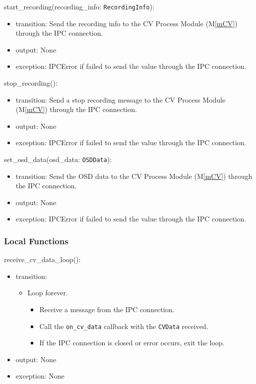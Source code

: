 \documentclass[12pt, titlepage]{article}
\newcommand{\mref}[1]{M\ref{#1}}
\begin{document}
\noindent start\_recording(recording\_info: \texttt{RecordingInfo}):
\begin{itemize}
  \item transition: Send the recording info to the CV Process Module (\mref{mCV})
        through the IPC connection.
  \item output: None
  \item exception: IPCError if failed to send the value through the IPC connection.
\end{itemize}

\noindent stop\_recording():
\begin{itemize}
  \item transition: Send a stop recording message to the CV Process Module (\mref{mCV})
        through the IPC connection.
  \item output: None
  \item exception: IPCError if failed to send the value through the IPC connection.
\end{itemize}

\noindent set\_osd\_data(osd\_data: \texttt{OSDData}):
\begin{itemize}
  \item transition: Send the OSD data to the CV Process Module (\mref{mCV}) through the
        IPC connection.
  \item output: None
  \item exception: IPCError if failed to send the value through the IPC connection.
\end{itemize}

\subsubsection{Local Functions}

\noindent receive\_cv\_data\_loop():
\begin{itemize}
  \item transition:
        \begin{itemize}
          \item Loop forever.
                \begin{itemize}
                  \item Receive a message from the IPC connection.
                  \item Call the \texttt{on\_cv\_data} callback with the \texttt{CVData} received.
                  \item If the IPC connection is closed or error occurs, exit the loop.
                \end{itemize}
        \end{itemize}
  \item output: None
  \item exception: None
\end{itemize}
\end{document}
